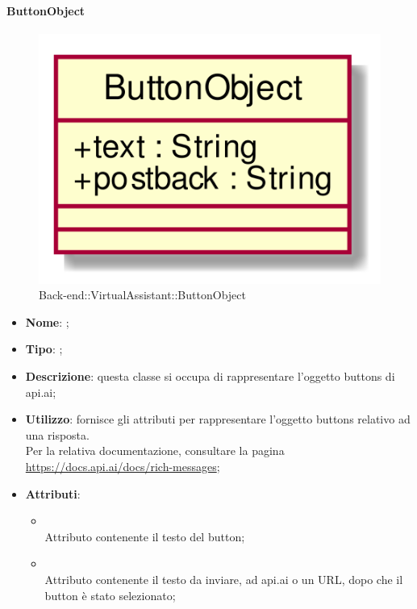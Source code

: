 \hypertarget{ButtonObject_label}{\paragraph{ButtonObject}}
\begin{figure}[h]
	\centering
	\includegraphics[width=\textwidth,height=\textheight,keepaspectratio]{images/ClassButtonObject.png}
	\caption{Back-end::VirtualAssistant::ButtonObject}
\end{figure}
\begin{itemize}
	\item \textbf{Nome}: ;
	\item \textbf{Tipo}: ;
	\item \textbf{Descrizione}: questa classe si occupa di rappresentare l'oggetto buttons di api.ai;
	\item \textbf{Utilizzo}: fornisce gli attributi per rappresentare l'oggetto buttons relativo ad una risposta. \\
Per la relativa documentazione, consultare la pagina \url{https://docs.api.ai/docs/rich-messages};
	\item \textbf{Attributi}:
	\begin{itemize}
		\item[]  \\
		Attributo contenente il testo del button;
		\item[]  \\
		Attributo contenente il testo da inviare, ad api.ai o un URL, dopo che il button è stato selezionato;
	\end{itemize}
\end{itemize}
\FloatBarrier

